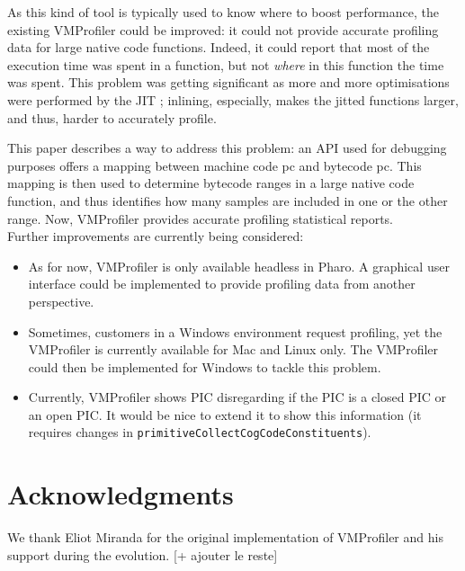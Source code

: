 \documentclass[10pt,preprint,nonatbib]{sigplanconf}
\newcommand{\ct}{\lstinline[backgroundcolor=\color{white},basicstyle=\small\ttfamily]}
\begin{document}
As this kind of tool is typically used to know where to boost performance, the existing VMProfiler could be improved: it could not provide accurate profiling data for large native code functions. Indeed, it could report that most of the execution time was spent in a function, but not \textit{where} in this function the time was spent.
This problem was getting significant as more and more optimisations were performed by the JIT ; inlining, especially, makes the jitted functions larger, and thus, harder to accurately profile.

This paper describes a way to address this problem: an API used for debugging purposes offers a mapping between machine code pc and bytecode pc. This mapping is then used to determine bytecode ranges in a large native code function, and thus identifies how many samples are included in one or the other range. Now, VMProfiler provides accurate profiling statistical reports. \\

Further improvements are currently being considered: 
\begin{itemize}
	\item As for now, VMProfiler is only available headless in Pharo. A graphical user interface could be implemented to provide profiling data from another perspective.
	\item Sometimes, customers in a Windows environment request profiling, yet the VMProfiler is currently available for Mac and Linux only. The VMProfiler could then be implemented for Windows to tackle this problem.
	\item Currently, VMProfiler shows PIC disregarding if the PIC is a closed PIC or an open PIC. It would be nice to extend it to show this information (it requires changes in \ct{primitiveCollectCogCodeConstituents}).
\end{itemize}


\section*{Acknowledgments}
We thank Eliot Miranda for the original implementation of VMProfiler and his support during the evolution.
[+ ajouter le reste]



%


\end{document}
